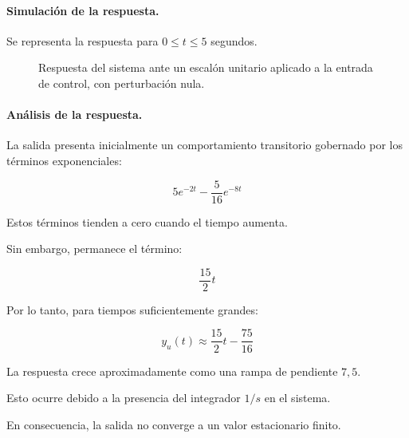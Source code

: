 \documentclass[12pt,a4paper]{article}
\begin{document}
\paragraph{Simulación de la respuesta.} Se representa la respuesta para $0\leq t\leq5$ segundos.

\begin{figure}[H]\centering{}\caption{Respuesta del sistema ante un escalón unitario aplicado a la entrada de control, con perturbación nula.}\end{figure}
\paragraph{Análisis de la respuesta.} La salida presenta inicialmente un comportamiento transitorio gobernado por los términos exponenciales:

\begin{equation}5e^{-2t}-\frac{5}{16}e^{-8t}\end{equation}

Estos términos tienden a cero cuando el tiempo aumenta.

Sin embargo, permanece el término:

\begin{equation}\frac{15}{2}t\end{equation}

Por lo tanto, para tiempos suficientemente grandes:

\begin{equation}\boxed{y_u(t)\approx\frac{15}{2}t-\frac{75}{16}}\end{equation}

La respuesta crece aproximadamente como una rampa de pendiente $7{,}5$.

Esto ocurre debido a la presencia del integrador $1/s$ en el sistema.

En consecuencia, la salida no converge a un valor estacionario finito.
\end{document}
